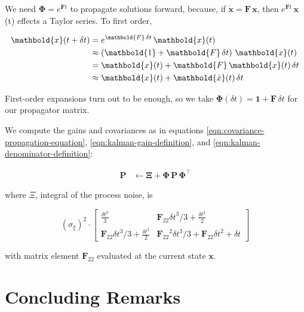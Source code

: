 \documentclass[10pt,oneside,x11names]{article}
\begin{document}
We need \(\mathbold{\Phi}=e^{\mathbold{F}t}\) to propagate solutions forward,
because, if
\(\mathbold{\dot{x}}=\mathbold{F}\,\mathbold{x}\), then
\(e^{\mathbold{F}t}\,\mathbold{x}\)(t) effects a Taylor series. To first order, 

\begin{align}
\notag
\mathbold{x}(t+\delta{t}) &= e^{\mathbold{F}\,\delta{t}}\,\mathbold{x}(t) \\
\label{eqn:expand-f}      &\approx \left(\mathbold{1} + \mathbold{F}\,\delta{t}\right)\,\mathbold{x}(t) \\
\notag                    &= \mathbold{x}(t) + \mathbold{F}\,\mathbold{x}(t)\,\delta{t} \\
\notag                    &\approx \mathbold{x}(t) + \mathbold{\dot{x}}(t)\,\delta{t}
\end{align}

\noindent First-order expansions turn out to be enough, so
we take \(\mathbold{\Phi}(\delta{t})=\mathbold{1}+\mathbold{F}\,\delta{t}\) for
our propagator matrix. 

We compute the gains and covariances as in equations
\ref{eqn:covariance-propagation-equation}, 
\ref{eqn:kalman-gain-definition}, and
\ref{eqn:kalman-denominator-definition}:

\begin{align}
\mathbold{P}
&\leftarrow
\mathbold{\Xi}+
\mathbold{\Phi}\,
\mathbold{P}\,
\mathbold{\Phi}^\intercal
\end{align}

\noindent where \(\Xi\), integral of the process noise, is 

\begin{equation}
\left(\sigma_\xi\right)^2\cdot
\begin{bmatrix}
 \underset{}{\frac{{\delta t}^3}{3}}
&
 \underset{}{{{{\mathbold{F}_{22}}} {\delta t}^3}/{3}+\frac{{\delta t}^2}{2}}
\\
 {{{\mathbold{F}_{22}}} {\delta t}^3}/{3}+\frac{{\delta t}^2}{2} 
&
 {{{\mathbold{F}_{22}}}^2 {\delta t}^3}/{3}+{{\mathbold{F}_{22}}} {\delta t}^2+{\delta t}
\end{bmatrix}
\end{equation}

\noindent with matrix element \(\mathbold{F}_{22}\) evaluated at the current state
\(\mathbold{x}\).

\section{Concluding Remarks}
\label{sec:orgheadline10}
\end{document}
